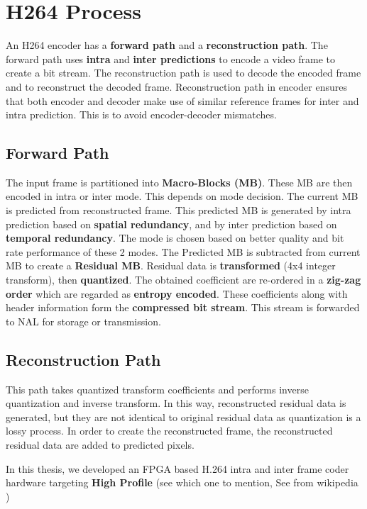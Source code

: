 \section{H264 Process}
An H264 encoder has a \textbf{forward path} and a \textbf{reconstruction path}. The forward path uses \textbf{intra} and \textbf{inter predictions} to encode a video frame to create a bit stream. The reconstruction path is used to decode the encoded frame and to reconstruct the decoded frame. Reconstruction path in encoder ensures that both encoder and decoder make use of similar reference frames for inter and intra prediction. This is to avoid encoder-decoder mismatches. 

\subsection{Forward Path}
The input frame is partitioned into \textbf{Macro-Blocks (MB)}. These MB are then encoded in intra or inter mode. This depends on mode decision. The current MB is predicted from reconstructed frame. This predicted MB is generated by intra prediction based on \textbf{spatial redundancy}, and by inter prediction based on \textbf{temporal redundancy}. The mode is chosen based on better quality and bit rate performance of these 2 modes. The Predicted MB is subtracted from current MB to create a \textbf{Residual MB}. Residual data is \textbf{transformed} (4x4 integer transform), then \textbf{quantized}. The obtained coefficient are re-ordered in a \textbf{zig-zag order} which are regarded as \textbf{entropy encoded}. These coefficients along with header information form the \textbf{compressed bit stream}. This stream is forwarded to NAL for storage or transmission. 

\subsection{Reconstruction Path}
This path takes quantized transform coefficients and performs inverse quantization and inverse transform. In this way, reconstructed residual data is generated, but they are not identical to original residual data as quantization is a lossy process. In order to create the reconstructed frame, the reconstructed residual data are added to predicted pixels. 

In this thesis, we developed an FPGA based H.264 intra and inter frame coder hardware targeting \textbf{High Profile} (see which one to mention, See from wikipedia )

